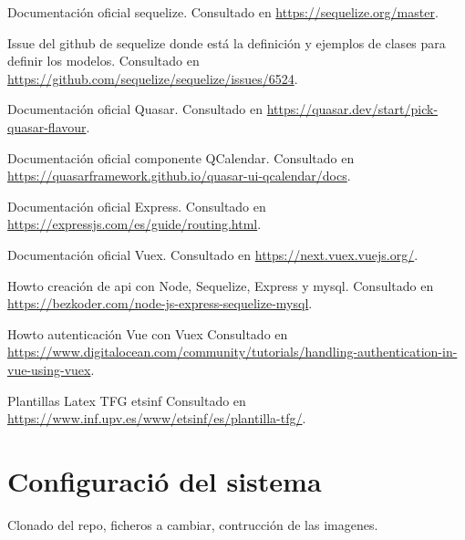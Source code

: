 \documentclass[11pt,spanish,listoffigures,listoftables]{tfgetsinf}
\begin{document}
\begin{thebibliography}{10}

   Documentación oficial sequelize.
   \newblock Consultado en 
   \url{https://sequelize.org/master}.

   Issue del github de sequelize donde está la definición y ejemplos de clases para definir los modelos.
   \newblock Consultado en
   \url{https://github.com/sequelize/sequelize/issues/6524}.

   Documentación oficial Quasar.
   \newblock Consultado en 
   \url{https://quasar.dev/start/pick-quasar-flavour}.

   Documentación oficial componente QCalendar.
   \newblock Consultado en 
   \url{https://quasarframework.github.io/quasar-ui-qcalendar/docs}.

   Documentación oficial Express.
   \newblock Consultado en 
   \url{https://expressjs.com/es/guide/routing.html}.

  Documentación oficial Vuex.
   \newblock Consultado en 
   \url{https://next.vuex.vuejs.org/}.

   Howto creación de api con Node, Sequelize, Express y mysql.
   \newblock Consultado en
   \url{https://bezkoder.com/node-js-express-sequelize-mysql}.

   Howto autenticación Vue con Vuex
   \newblock Consultado en
   \url{https://www.digitalocean.com/community/tutorials/handling-authentication-in-vue-using-vuex}.

   Plantillas Latex TFG etsinf
   \newblock Consultado en
   \url{https://www.inf.upv.es/www/etsinf/es/plantilla-tfg/}.

   

\end{thebibliography}
\cleardoublepage


\APPENDIX


\chapter{Configuració del sistema}
\label{chapter:config}
Clonado del repo, ficheros a cambiar, contrucción de las imagenes.



\end{document}
